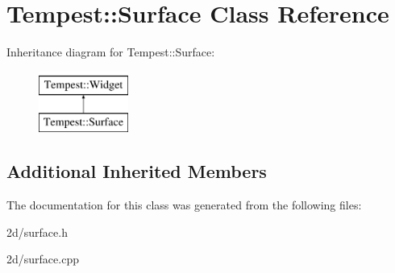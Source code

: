 \hypertarget{class_tempest_1_1_surface}{\section{Tempest\+:\+:Surface Class Reference}
\label{class_tempest_1_1_surface}
}
Inheritance diagram for Tempest\+:\+:Surface\+:\begin{figure}[H]
\begin{center}
\leavevmode
\includegraphics[height=2.000000cm]{class_tempest_1_1_surface}
\end{center}
\end{figure}
\subsection*{Additional Inherited Members}


The documentation for this class was generated from the following files\+:\begin{DoxyCompactItemize}
\item 
2d/surface.\+h\item 
2d/surface.\+cpp\end{DoxyCompactItemize}
